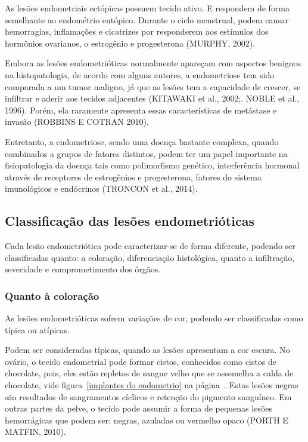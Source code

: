 \documentclass[12pt]{article} %
\begin{document}
As lesões endometriais ectópicas possuem tecido ativo. E respondem de
forma semelhante ao endométrio eutópico. Durante o ciclo menstrual,
podem causar hemorragias, inflamações e cicatrizes por responderem aos
estímulos dos hormônios ovarianos, o estrogênio e
progesterona (MURPHY, 2002).

Embora as lesões endometrióticas normalmente apareçam com aspectos
benignos na histopatologia, de acordo com alguns autores, a
endometriose tem sido comparada a um tumor maligno, já que as lesões
tem a capacidade de crescer, se infiltrar e aderir aos tecidos
adjacentes (KITAWAKI et al., 2002;. NOBLE et al., 1996). Porém, ela
raramente apresenta essas características de metástase e invasão
(ROBBINS E COTRAN 2010). 

Entretanto, a endometriose, sendo uma doença bastante complexa, 
quando combinados a grupos de fatores distintos, podem ter um papel
importante na fisiopatologia da doença tais como polimorfismo 
genético, interferência hormonal através de receptores de estrogênios
e progesterona, fatores do sistema imunológicos e endócrinos (TRONCON
et al., 2014).

\subsection{Classificação das lesões endometrióticas}
Cada lesão endometriótica pode caracterizar-se de forma diferente, podendo ser classificadas
quanto: a coloração, diferenciação histológica, quanto a infiltração, severidade e comprometimento dos órgãos.


\subsubsection{Quanto à coloração} 

As lesões endometrióticas sofrem variações de cor, podendo ser classificadas como típica ou atípicas.

Podem ser consideradas típicas, quando as lesões apresentam a cor
escura.  No ovário, o tecido endometrial pode formar cistos,
conhecidos como cistos de chocolate, pois, eles estão repletos de
sangue velho que se assemelha a calda de chocolate, vide
figura~\ref{implantes do endometrio} na página~\pageref{implantes do
  endometrio}. Estas lesões negras são resultados de sangramentos
cíclicos e retenção do pigmento sanguíneo. Em outras partes da pelve,
o tecido pode assumir a forma de pequenas lesões hemorrágicas que
podem ser: negras, azuladas ou vermelho opaco (PORTH E MATFIN, 2010).
\end{document}
